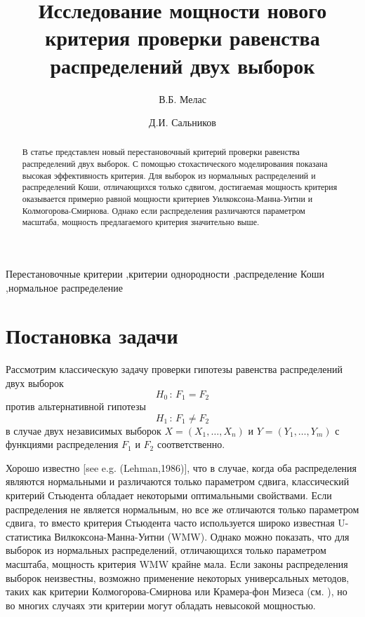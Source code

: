 \documentclass[final,11pt,3p]{elsarticle}
\begin{document}
\begin{frontmatter}
\title{Исследование мощности нового критерия проверки равенства распределений двух выборок}

\author[label1]{В.Б. Мелас}
\author[label1]{Д.И. Сальников}
\address[label1]{Санкт-Петербургский государственный университет, \\
                 Санкт-Петербург, Россия}

\begin{abstract}
В статье представлен новый перестановочный критерий проверки равенства распределений двух выборок. С помощью стохастического моделирования показана высокая эффективность критерия. Для выборок из нормальных распределений и распределений Коши, отличающихся только сдвигом, достигаемая мощность критерия оказывается примерно равной мощности критериев Уилкоксона-Манна-Уитни и Колмогорова-Смирнова. Однако если распределения различаются параметром масштаба, мощность предлагаемого критерия значительно выше.
\end{abstract}

\begin{keyword}
Перестановочные критерии \sep критерии однородности \sep распределение Коши \sep нормальное распределение
\end{keyword}
\end{frontmatter}


\section{Постановка задачи}
\label{S:1}
Рассмотрим классическую задачу проверки гипотезы равенства распределений двух выборок
\begin{equation}
  \label{H0}
  H_0\,:\,F_1 = F_2
\end{equation}
против альтернативной гипотезы
\begin{equation}
  \label{H1}
  H_1\,:\,F_1 \not= F_2
\end{equation}
в случае двух независимых выборок $X=(X_{1},\ldots, X_{n})$ и $Y=(Y_{1},\ldots, Y_{m})$ с функциями распределения $F_1$ и $F_2$ соответственно.

Хорошо известно [see e.g. (Lehman,1986)], что в случае, когда оба распределения являются нормальными и различаются только параметром сдвига, классический критерий Стьюдента обладает некоторыми оптимальными свойствами. Если распределения не является нормальным, но все же отличаются только параметром сдвига, то вместо критерия Стьюдента часто используется широко известная U-статистика Вилкоксона-Манна-Уитни (WMW). Однако можно показать, что для выборок из нормальных распределений, отличающихся только параметром масштаба, мощность критерия WMW крайне мала. Если законы распределения выборок неизвестны, возможно применение некоторых универсальных методов, таких как критерии Колмогорова-Смирнова или Крамера-фон Мизеса (см. \cite{Buening2001}), но во многих случаях эти критерии могут обладать невысокой мощностью.
\end{document}
